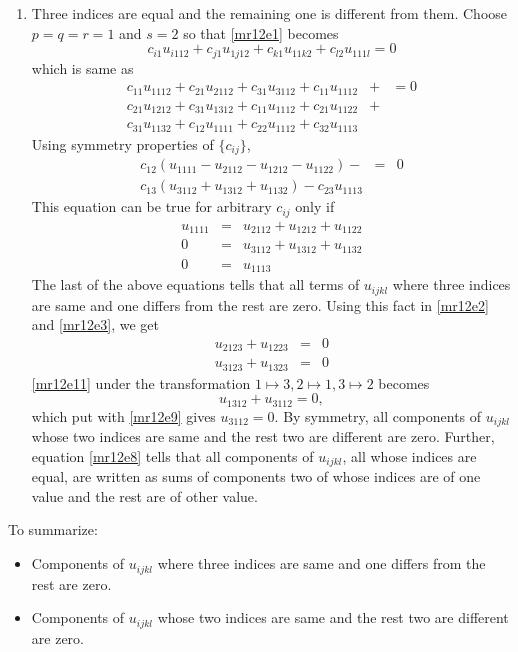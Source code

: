 \begin{itemize}
\begin{enumerate}
\item Three indices are equal and the remaining one is different from them. Choose $p = q = r = 1$ and $s = 2$ so that \eqref{mr12e1} becomes
\[
c_{i1}u_{i112} + c_{j1}u_{1j12} + c_{k1}u_{11k2} + c_{l2}u_{111l} = 0
\]
which is same as
\begin{eqnarray*}
c_{11}u_{1112} + c_{21}u_{2112} + c_{31}u_{3112} + c_{11}u_{1112} &+& = 0 \\
c_{21}u_{1212} + c_{31}u_{1312} + c_{11}u_{1112} + c_{21}u_{1122} &+& \\
c_{31}u_{1132} + c_{12}u_{1111} + c_{22}u_{1112} + c_{32}u_{1113} & & 
\end{eqnarray*}
Using symmetry properties of $\{c_{ij}\}$,
\begin{eqnarray*}
c_{12}(u_{1111} - u_{2112} - u_{1212} - u_{1122}) - &=& 0 \\
c_{13}(u_{3112} + u_{1312} + u_{1132}) - c_{23}u_{1113} & &
\end{eqnarray*}
This equation can be true for arbitrary $c_{ij}$ only if
\begin{eqnarray}
u_{1111} &=& u_{2112} + u_{1212} + u_{1122} \label{mr12e8} \\
0 &=& u_{3112} + u_{1312} + u_{1132} \label{mr12e9} \\
0 &=& u_{1113} \label{mr12e10}
\end{eqnarray}
The last of the above equations tells that all terms of $u_{ijkl}$ where three indices are same and one differs from the rest are zero. Using this fact in \eqref{mr12e2} and 
\eqref{mr12e3}, we get
\begin{eqnarray}
u_{2123} + u_{1223} &=& 0 \label{mr12e11} \\
u_{3123} + u_{1323} &=& 0 \label{mr12e12}
\end{eqnarray}
\eqref{mr12e11} under the transformation $1 \mapsto 3, 2\mapsto 1, 3 \mapsto 2$ becomes
\[
u_{1312} + u_{3112} = 0,
\]
which put with \eqref{mr12e9} gives $u_{3112} = 0$. By symmetry, all components of $u_{ijkl}$ whose two indices are same and the rest two are different are zero. Further, equation 
\eqref{mr12e8} tells that all components of $u_{ijkl}$, all whose indices are equal, are written as sums of components two of whose indices are of one value and the rest are of other
value.
\end{enumerate}
To summarize:
\begin{itemize}
\item Components of $u_{ijkl}$ where three indices are same and one differs from the rest are zero.
\item Components of $u_{ijkl}$ whose two indices are same and the rest two are different are zero.

\end{itemize}
\end{itemize}
